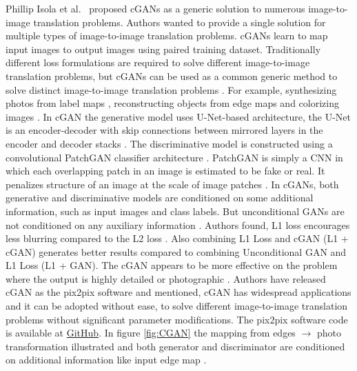 Phillip Isola et al.\ \cite{isola2018imagetoimage} proposed \acp{cGAN} as a generic solution to numerous image-to-image translation problems. Authors wanted to provide a single solution for multiple types of image-to-image translation problems. \acp{cGAN} learn to map input images to output images using paired training dataset. Traditionally different loss formulations are required to solve different image-to-image translation problems, but \acp{cGAN} can be used as a common generic method to solve distinct image-to-image translation problems \cite{isola2018imagetoimage}. For example, synthesizing photos from label maps \cite{cordts2016cityscapes}, reconstructing objects from edge maps \cite{zhu2018generative} \cite{6909426} and colorizing images \cite{wesley2021colorizing}. In \ac{cGAN} the generative model uses U-Net-based architecture, the U-Net is an encoder-decoder with skip connections between mirrored layers in the encoder and decoder stacks \cite{ronneberger2015unet}. The discriminative model is constructed using a convolutional PatchGAN classifier architecture \cite{demir2018patchbased}. PatchGAN is simply a \ac{CNN} in which each overlapping patch in an image is estimated to be fake or real. It penalizes structure of an image at the scale of image patches \cite{li2016precomputed}. In \acp{cGAN}, both generative and discriminative models are conditioned on some additional information, such as input images and class labels. But unconditional \acp{GAN} are not conditioned on any auxiliary information \cite{isola2018imagetoimage}. Authors found, L1 loss encourages less blurring compared to the L2 loss \cite{isola2018imagetoimage}. Also combining L1 Loss and \ac{cGAN} (L1 + \ac{cGAN}) generates better results compared to combining Unconditional \ac{GAN} and L1 Loss (L1 + \ac{GAN}). The \ac{cGAN} appears to be more effective on the problem where the output is highly detailed or photographic \cite{isola2018imagetoimage}. Authors have released \ac{cGAN} as the pix2pix software and mentioned, \ac{cGAN} has widespread applications and it can be adopted without ease, to solve different image-to-image translation problems without significant parameter modifications. The pix2pix software code is available at \href{https://github.com/phillipi/pix2pix.}{GitHub}. In figure \ref{fig:CGAN} the mapping from edges $\rightarrow$ photo transformation illustrated and both generator and discriminator are conditioned on additional information like input edge map \cite{isola2018imagetoimage}.


